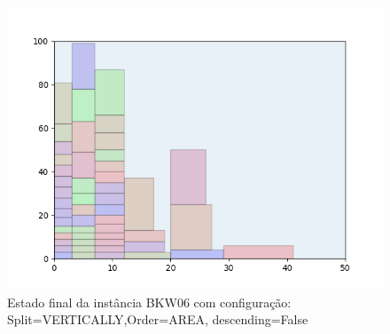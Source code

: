 \begin{figure}[H]
    \centering
    \caption[]{Estado final da instância BKW06 com configuração: Split=VERTICALLY,Order=AREA, descending=False}
    \label{fig:bkw06-vertically-area-false}
    \includegraphics[scale=0.5]{output/figures/bkw/bkw06/vertically/area/false/00}
\end{figure}